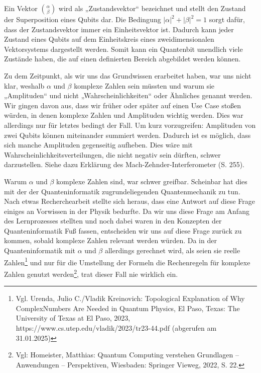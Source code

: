 Ein Vektor $\binom{\alpha}{\beta}$ wird als „Zustandsvektor“ bezeichnet und stellt den Zustand der Superposition eines Qubits dar. Die Bedingung $\left|\alpha\right|^2+\left|\beta\right|^2=1$ sorgt dafür, dass der Zustandsvektor immer ein Einheitsvektor ist. Dadurch kann jeder Zustand eines Qubits auf dem Einheitskreis eines zweidimensionalen Vektorsystems dargestellt werden. Somit kann ein Quantenbit unendlich viele Zustände haben, die auf einen definierten Bereich abgebildet werden können. 

\begin{tcolorbox}[title=Kommentar,
    title filled=false,
    colback=cyan!5!white,
    colframe=cyan!75!black]
Zu dem Zeitpunkt, als wir uns das Grundwissen erarbeitet haben, war uns nicht klar, weshalb $\alpha$ und $\beta$ komplexe Zahlen sein müssten und warum sie „Amplituden“ und nicht „Wahrscheinlichkeiten“ oder Ähnliches genannt werden. Wir gingen davon aus, dass wir früher oder später auf einen Use Case stoßen würden, in denen komplexe Zahlen und Amplituden wichtig werden. Dies war allerdings nur für letztes bedingt der Fall. Um kurz vorzugreifen: Amplituden von zwei Qubits können miteinander summiert werden. Dadurch ist es möglich, dass sich manche Amplituden gegenseitig aufheben. Dies wäre mit Wahrscheinlichkeitsverteilungen, die nicht negativ sein dürften, schwer darzustellen. Siehe dazu Erklärung des Mach-Zehnder-Interferometer (S. 255).

Warum $\alpha$ und $\beta$ komplexe Zahlen sind, war schwer greifbar. Scheinbar hat dies mit der der Quanteninformatik zugrundeliegenden Quantenmechanik zu tun. Nach etwas Recherchearbeit stellte sich heraus, dass eine Antwort auf diese Frage einiges an Vorwissen in der Physik bedurfte. Da wir uns diese Frage am Anfang des Lernprozesses stellten und noch dabei waren in den Konzepten der Quanteninformatik Fuß fassen, entscheiden wir uns auf diese Frage zurück zu kommen, sobald komplexe Zahlen relevant werden würden. Da in der Quanteninformatik mit $\alpha$ und $\beta$ allerdings gerechnet wird, als seien sie reelle Zahlen\footnote{Vgl. Urenda, Julio C./Vladik Kreinovich: Topological Explanation of Why ComplexNumbers Are Needed in Quantum Physics, El Paso, Texas: The University of Texas at El Paso, 2023, https://www.cs.utep.edu/vladik/2023/tr23-44.pdf (abgerufen am 31.01.2025)} und nur für die Umstellung der Formeln die Rechenregeln für komplexe Zahlen genutzt werden\footnote{Vgl: Homeister, Matthias: Quantum Computing verstehen Grundlagen – Anwendungen –
Perspektiven, Wiesbaden: Springer Vieweg, 2022, S. 22.}, trat dieser Fall nie wirklich ein. 


\end{tcolorbox}

